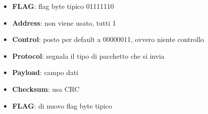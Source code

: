 \begin{itemize}
\item{\textbf{FLAG}: flag byte tipico 01111110}
\item{\textbf{Address}: non viene usato, tutti 1}
\item{\textbf{Control}: posto per default a 00000011, ovvero niente controllo}
\item{\textbf{Protocol}: segnala il tipo di pacchetto che si invia}
\item{\textbf{Payload}: campo dati}
\item{\textbf{Checksum}: usa CRC}
\item{\textbf{FLAG}: di nuovo flag byte tipico}
\end{itemize}
